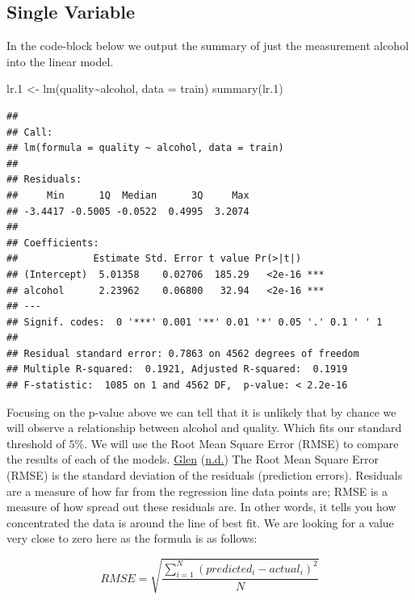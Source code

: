 \documentclass[
]{book}
\newenvironment{Shaded}{\begin{snugshade}}{\end{snugshade}}
\newcommand{\AttributeTok}[1]{\textcolor[rgb]{0.77,0.63,0.00}{#1}}
\newcommand{\FloatTok}[1]{\textcolor[rgb]{0.00,0.00,0.81}{#1}}
\newcommand{\FunctionTok}[1]{\textcolor[rgb]{0.00,0.00,0.00}{#1}}
\newcommand{\NormalTok}[1]{#1}
\newcommand{\OtherTok}[1]{\textcolor[rgb]{0.56,0.35,0.01}{#1}}
\newcommand{\SpecialCharTok}[1]{\textcolor[rgb]{0.00,0.00,0.00}{#1}}
\begin{document}
\hypertarget{single-variable}{%
\subsection{Single Variable}\label{single-variable}}

In the code-block below we output the summary of just the measurement alcohol into the linear model.

\begin{Shaded}
\begin{Highlighting}[]
\NormalTok{lr}\FloatTok{.1} \OtherTok{\textless{}{-}} \FunctionTok{lm}\NormalTok{(quality}\SpecialCharTok{\textasciitilde{}}\NormalTok{alcohol, }\AttributeTok{data =}\NormalTok{ train)}
\FunctionTok{summary}\NormalTok{(lr}\FloatTok{.1}\NormalTok{)}
\end{Highlighting}
\end{Shaded}

\begin{verbatim}
## 
## Call:
## lm(formula = quality ~ alcohol, data = train)
## 
## Residuals:
##     Min      1Q  Median      3Q     Max 
## -3.4417 -0.5005 -0.0522  0.4995  3.2074 
## 
## Coefficients:
##             Estimate Std. Error t value Pr(>|t|)    
## (Intercept)  5.01358    0.02706  185.29   <2e-16 ***
## alcohol      2.23962    0.06800   32.94   <2e-16 ***
## ---
## Signif. codes:  0 '***' 0.001 '**' 0.01 '*' 0.05 '.' 0.1 ' ' 1
## 
## Residual standard error: 0.7863 on 4562 degrees of freedom
## Multiple R-squared:  0.1921, Adjusted R-squared:  0.1919 
## F-statistic:  1085 on 1 and 4562 DF,  p-value: < 2.2e-16
\end{verbatim}

Focusing on the p-value above we can tell that it is unlikely that by chance we will observe a relationship between alcohol and quality. Which fits our standard threshold of \(5\%\).
We will use the Root Mean Square Error (RMSE) to compare the results of each of the models. \protect\hyperlink{ref-RMSE}{Glen} (\protect\hyperlink{ref-RMSE}{n.d.}) The Root Mean Square Error (RMSE) is the standard deviation of the residuals (prediction errors). Residuals are a measure of how far from the regression line data points are; RMSE is a measure of how spread out these residuals are. In other words, it tells you how concentrated the data is around the line of best fit. We are looking for a value very close to zero here as the formula is as follows:

\[RMSE = \sqrt{\frac{\sum_{i=1}^{N}(predicted_i - actual_i)^2}{N}}\]
\end{document}
